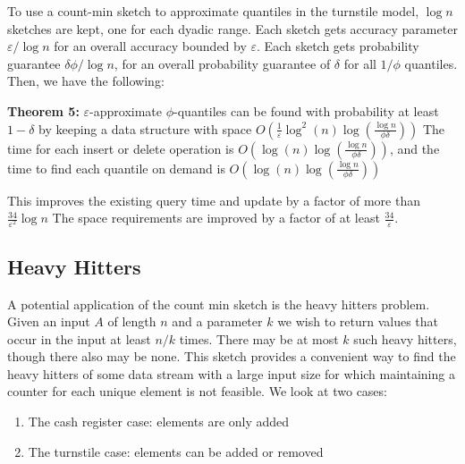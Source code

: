 \documentclass[11pt]{article}
\begin{document}
To use a count-min sketch to approximate quantiles in the turnstile model, $\log n$ sketches are kept,
one for each dyadic range. Each sketch gets accuracy parameter $\varepsilon/\log n$ for an overall accuracy
bounded by $\varepsilon$. Each sketch gets probability guarantee $\delta\phi/\log n$, for
an overall probability guarantee of $\delta$ for all $1/\phi$ quantiles. Then, we have the following:

\textbf{Theorem 5:} $\varepsilon$-approximate $\phi$-quantiles can be found with probability at least
$1 - \delta$ by keeping a data structure with space $O\left(\frac{1}{\varepsilon}
\log^2(n) \log \left(\frac{\log n}{\phi \delta}\right)\right)$ The time for each insert or delete operation is
$O\left(\log(n) \log \left(\frac{\log n}{\phi \delta}\right)\right)$, and the time to find each quantile on demand 
is $O\left(\log(n)\log\left(\frac{\log n}{\phi \delta}\right)\right)$

This improves the existing query time and update by a factor of more than $\frac{34}{\varepsilon^2} \log n$
The space requirements are improved by a factor of at least $\frac{34}{\varepsilon}$. 

\subsection{Heavy Hitters}
A potential application of the count min sketch is the heavy hitters problem. Given an input $A$ of length $n$ and a parameter $k$ we wish to return values that occur in the input at least $n/k$ times. There may be at most $k$ such heavy hitters, though there also may be none. This sketch provides a convenient way to find the heavy hitters of some data stream with a large input size for which  maintaining a counter for each unique element is not feasible. We look at two cases:
\begin{enumerate}
\item The cash register case: elements are only added
\item The turnstile case: elements can be added or removed
\end{enumerate}
\end{document}
